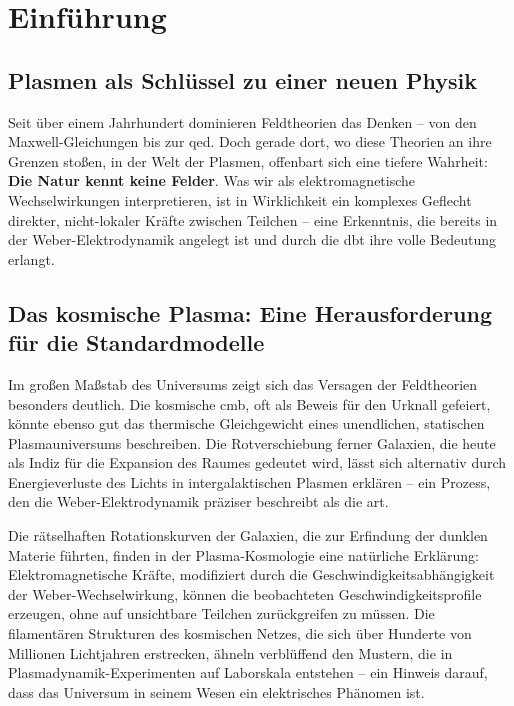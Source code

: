 \chapter{Einführung}
\section{Plasmen als Schlüssel zu einer neuen Physik}
Seit über einem Jahrhundert dominieren Feldtheorien das Denken – von den Maxwell-Gleichungen bis zur \gls{qed}. Doch gerade dort, wo diese Theorien an ihre Grenzen stoßen, in der
Welt der Plasmen, offenbart sich eine tiefere Wahrheit: \textbf{Die Natur kennt keine Felder}. Was wir als elektromagnetische Wechselwirkungen interpretieren, ist in Wirklichkeit ein
komplexes Geflecht direkter, nicht-lokaler Kräfte zwischen Teilchen – eine Erkenntnis, die bereits in der Weber-Elektrodynamik angelegt ist und durch die \gls{dbt} ihre volle
Bedeutung erlangt.

\section{Das kosmische Plasma: Eine Herausforderung für die Standardmodelle}
Im großen Maßstab des Universums zeigt sich das Versagen der Feldtheorien besonders deutlich. Die kosmische \gls{cmb}, oft als Beweis für den Urknall gefeiert, könnte
ebenso gut das thermische Gleichgewicht eines unendlichen, statischen Plasmauniversums beschreiben. Die Rotverschiebung ferner Galaxien, die heute als Indiz für die Expansion des
Raumes gedeutet wird, lässt sich alternativ durch Energieverluste des Lichts in intergalaktischen Plasmen erklären – ein Prozess, den die Weber-Elektrodynamik präziser beschreibt
als die \gls{art}.

Die rätselhaften Rotationskurven der Galaxien, die zur Erfindung der dunklen Materie führten, finden in der Plasma-Kosmologie eine natürliche Erklärung: Elektromagnetische Kräfte,
modifiziert durch die Geschwindigkeitsabhängigkeit der Weber-Wechselwirkung, können die beobachteten Geschwindigkeitsprofile erzeugen, ohne auf unsichtbare Teilchen zurückgreifen
zu müssen. Die filamentären Strukturen des kosmischen Netzes, die sich über Hunderte von Millionen Lichtjahren erstrecken, ähneln verblüffend den Mustern, die in
Plasmadynamik-Experimenten auf Laborskala entstehen – ein Hinweis darauf, dass das Universum in seinem Wesen ein elektrisches Phänomen ist.

